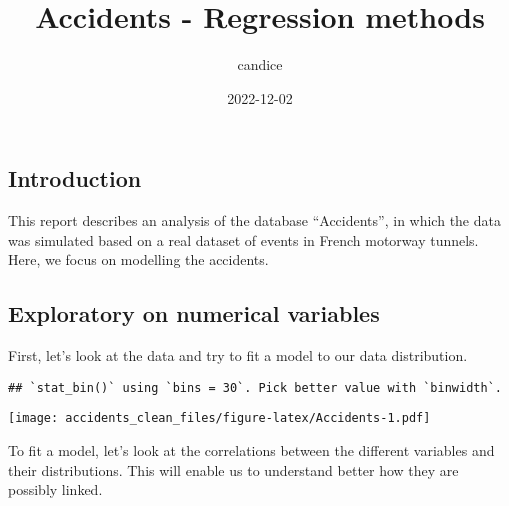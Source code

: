 \documentclass[
]{article}
\title{Accidents - Regression methods}
\author{candice}
\date{2022-12-02}
\begin{document}
\maketitle

\hypertarget{introduction}{%
\subsection{Introduction}\label{introduction}}

This report describes an analysis of the database ``Accidents'', in
which the data was simulated based on a real dataset of events in French
motorway tunnels. Here, we focus on modelling the accidents.

\hypertarget{exploratory-on-numerical-variables}{%
\subsection{Exploratory on numerical
variables}\label{exploratory-on-numerical-variables}}

First, let's look at the data and try to fit a model to our data
distribution.

\begin{verbatim}
## `stat_bin()` using `bins = 30`. Pick better value with `binwidth`.
\end{verbatim}

\texttt{[image: accidents\_clean\_files/figure-latex/Accidents-1.pdf]}

To fit a model, let's look at the correlations between the different
variables and their distributions. This will enable us to understand
better how they are possibly linked.
\end{document}
